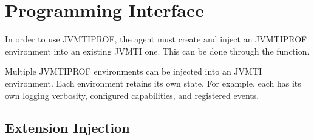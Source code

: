 \chapter{Programming Interface} \label{chap:api}

In order to use JVMTIPROF, the agent must create and inject an JVMTIPROF environment into an existing JVMTI one. This can be done through the \hyperref[api:jvmtiProf_Create]{} function.

Multiple JVMTIPROF environments can be injected into an JVMTI environment. Each environment retains its own state. For example, each has its own logging verbosity, configured capabilities, and registered events.





\section{Extension Injection}

